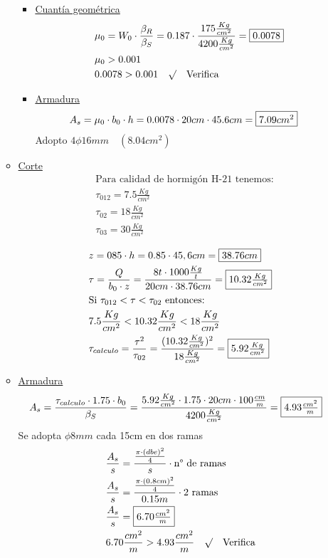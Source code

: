 \begin{enumerate}
\begin{itemize}
\begin{itemize}
\item \underline{Cuantía geométrica}
\begin{align*}
&\mu_0 = W_0 \cdot \frac{\beta_R}{\beta_S} = 0.187 \cdot \frac{175 \frac{Kg}{cm^2}}{4200 \frac{Kg}{cm^2}} = \framebox{$0.0078$}\\
&\mu_0 > 0.001\\
& 0.0078 > 0.001 \quad \surd \quad \text{Verifica}
\end{align*}

\item \underline{Armadura}
\begin{align*}
& A_s = \mu_0 \cdot b_0 \cdot h = 0.0078 \cdot 20cm \cdot 45.6cm = \framebox{$7.09cm^2$}
\end{align*}
Adopto $4 \phi 16mm \quad (8.04cm^2)$
\end{itemize}
\newpage
\item \underline{Corte}
\begin{align*}
& \text{Para calidad de hormigón H-21 tenemos:}\\
& \tau_{012} = 7.5 \frac{Kg}{cm^2}\\
& \tau_{02} = 18 \frac{Kg}{cm^2}\\
& \tau_{03} = 30 \frac{Kg}{cm^2}
\end{align*}

\begin{align*}
& z = 085 \cdot h = 0.85 \cdot 45,6cm = \framebox{$38.76cm$}\\
& \tau = \frac{Q}{b_0 \cdot z} = \frac{8t \cdot 1000\frac{Kg}{t}}{20cm \cdot 38.76cm} = \framebox{$10.32 \frac{Kg}{cm^2}$}\\
& \text{Si } \tau_{012} < \tau < \tau_{02} \text{ entonces:}\\
& 7.5 \frac{Kg}{cm^2} < 10.32 \frac{Kg}{cm^2} < 18 \frac{Kg}{cm^2}\\
& \tau_{calculo} = \frac{\tau^2}{\tau_{02}} = \frac{(10.32 \frac{Kg}{cm^2})^2}{18 \frac{Kg}{cm^2}} = \framebox{$5.92 \frac{Kg}{cm^2}$}\\
\end{align*}

\item \underline{Armadura}
\begin{align*}
& A_s = \frac{\tau_{calculo} \cdot 1.75 \cdot b_0}{\beta_S} = \frac{5.92 \frac{Kg}{cm^2} \cdot 1.75 \cdot 20cm \cdot 100\frac{cm}{m}}{4200 \frac{Kg}{cm^2}}= \framebox{$4.93 \frac{cm^2}{m}$}
\end{align*}
Se adopta $\phi 8mm$ cada 15cm en dos ramas
\begin{align*}
& \frac{A_s}{s} = \frac{\frac{\pi \cdot (dbe)^2}{4}}{s}\cdot \text{n° de ramas}\\
& \frac{A_s}{s} = \frac{\frac{\pi \cdot (0.8cm)^2}{4}}{0.15m}\cdot \text{2 ramas}\\
& \frac{A_s}{s} = \framebox{$6.70 \frac{cm^2}{m}$}\\
& 6.70 \frac{cm^2}{m} > 4.93 \frac{cm^2}{m} \quad \surd \quad \text{Verifica}
\end{align*}


\end{itemize}
\end{enumerate}
